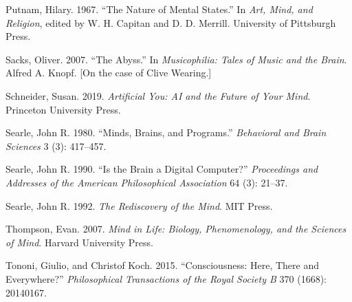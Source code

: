 \documentclass[11pt]{article}
\begin{document}
\begin{flushleft}
Putnam, Hilary. 1967. ``The Nature of Mental States.'' In \emph{Art, Mind, and Religion}, edited by W. H. Capitan and D. D. Merrill. University of Pittsburgh Press.\par
\vspace{0.4em}
Sacks, Oliver. 2007. ``The Abyss.'' In \emph{Musicophilia: Tales of Music and the Brain}. Alfred A. Knopf. [On the case of Clive Wearing.]\par
\vspace{0.4em}
Schneider, Susan. 2019. \emph{Artificial You: AI and the Future of Your Mind}. Princeton University Press.\par
\vspace{0.4em}
Searle, John R. 1980. ``Minds, Brains, and Programs.'' \emph{Behavioral and Brain Sciences} 3 (3): 417--457.\par
\vspace{0.4em}
Searle, John R. 1990. ``Is the Brain a Digital Computer?'' \emph{Proceedings and Addresses of the American Philosophical Association} 64 (3): 21--37.\par
\vspace{0.4em}
Searle, John R. 1992. \emph{The Rediscovery of the Mind}. MIT Press.\par
\vspace{0.4em}
Thompson, Evan. 2007. \emph{Mind in Life: Biology, Phenomenology, and the Sciences of Mind}. Harvard University Press.\par
\vspace{0.4em}
Tononi, Giulio, and Christof Koch. 2015. ``Consciousness: Here, There and Everywhere?'' \emph{Philosophical Transactions of the Royal Society B} 370 (1668): 20140167.\par

\end{flushleft}
\end{document}
